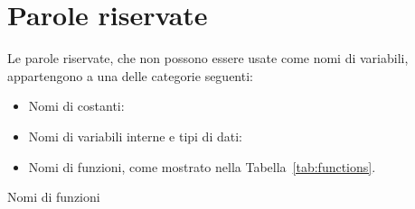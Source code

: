 \chapter{Parole riservate}
\label{reswords}

Le parole riservate, che non possono essere usate come nomi di variabili,
appartengono a una delle categorie seguenti:

\begin{itemize}
\item Nomi di costanti:
  

\item Nomi di variabili interne e tipi di dati:
  

\item Nomi di funzioni, come mostrato nella Tabella~\ref{tab:functions}.
\end{itemize}

\begin{table}[htbp]
\caption{Nomi di funzioni}
\label{tab:functions}
\begin{center}

\end{center}
\end{table}


